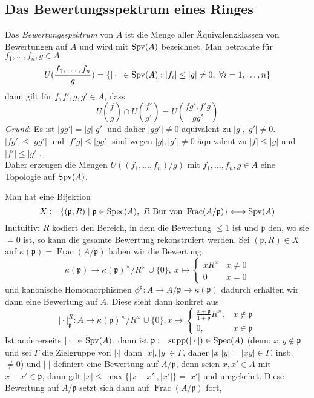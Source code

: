 \subsection*{Das Bewertungsspektrum eines Ringes}
\begin{defn}
    Das \textit{Bewertungsspektrum} von $A$ ist die Menge aller Äquivalenzklassen von Bewertungen auf $A$ und wird 
    mit $\operatorname{Spv}(A)$ bezeichnet. Man betrachte für $f_1,\ldots,f_n,g\in A$
    \[
    U(\frac{f_1,\ldots,f_n}{g}) = \{ \vert \cdot \vert \in \Spv{A} : \vert f_i\vert \le \vert g\vert \neq 0, \ \forall i=1,\ldots,n\}    
    \]
    dann gilt für $f,f',g,g'\in A$, dass 
    \[
    U(\frac{f}{g})\cap U(\frac{f'}{g'}) = U(\frac{fg',f'g}{gg'})    
    \]
    \textit{Grund}: Es ist $\vert gg'\vert = \vert g\vert \vert g'\vert$ und daher $\vert gg'\vert \neq 0$ äquivalent zu $\vert g\vert,\vert g'\vert \neq 0$. $\vert fg' \vert \le \vert gg'\vert$ und $\vert f'g \vert \le \vert gg'\vert$ sind wegen $\vert g\vert,\vert g'\vert \neq 0$ äquivalent zu $\vert f\vert \le \vert g\vert$ und $\vert f'\vert \le \vert g'\vert$.
    \\ Daher erzeugen die Mengen $U((f_1,\ldots,f_n)/g)$ mit $f_1,\ldots,f_n,g\in A$ eine Topologie auf $\operatorname{Spv}(A)$.
\end{defn}
Man hat eine Bijektion 
\[
    X\coloneqq\{  (\mathfrak{p},R) \mid \mathfrak{p}\in \operatorname{Spec}(A), \ R \text{ Bur von } \operatorname{Frac}(A/\mathfrak{p}) \} \longleftrightarrow \operatorname{Spv}(A)    
\]
Inutuitiv: $R$ kodiert den Bereich, in dem die Bewertung $\le 1$ ist und $\mathfrak{p}$ den, wo sie $=0$ ist, so kann die gesamte Bewertung rekonstruiert werden. Sei $(\mathfrak{p},R)\in X$ auf $\kappa(\mathfrak{p})=\operatorname{Frac}(A/\mathfrak{p})$ haben wir die Bewertung
\[
\kappa(\mathfrak{p}) \to \kappa(\mathfrak{p})^\times / R^\times \cup \{0\}, \ x\mapsto \begin{cases}
    xR^\times & x\neq 0 \\
    0 & x=0
\end{cases}    
\]
und kanonische Homomorphismen $\phi^\mathfrak{p}:A\to A/\mathfrak{p} \to \kappa(\mathfrak{p})$ dadurch erhalten wir dann eine Bewertung auf $A$. Diese sieht dann konkret aus 
\[
\vert \cdot \vert_\mathfrak{p}^R : A\to \kappa(\mathfrak{p})^\times / R^\times \cup\{0\}, x \mapsto \begin{cases}
    \frac{x+\mathfrak{p}}{1+\mathfrak{p}}R^\times, & x\notin \mathfrak{p} \\
    0, & x\in \mathfrak{p}
\end{cases}  
\]
Ist andererseits $\vert \cdot \vert\in \operatorname{Spv}(A)$, dann ist $\mathfrak{p}\coloneqq \operatorname{supp}(\vert \cdot \vert)\in \operatorname{Spec}(A)$ (denn: $x,y\notin \mathfrak{p}$ und sei $\Gamma$ die Zielgruppe von $\vert\cdot\vert$ dann $\vert x\vert,\vert y\vert\in \Gamma$, daher $\vert x\vert \vert y\vert = \vert xy\vert \in \Gamma$, insb. $\neq 0$) und $\vert \cdot\vert$ definiert eine Bewertung auf $A/\mathfrak{p}$, denn seien $x,x'\in A$ mit $x-x'\in \mathfrak{p}$, dann gilt $\vert x\vert \le \max\{ \vert x-x'\vert,\vert x'\vert \}=\vert x'\vert$ und umgekehrt. Diese Bewertung auf $A/\mathfrak{p}$ setzt sich dann auf $\operatorname{Frac}(A/\mathfrak{p})$ fort,
